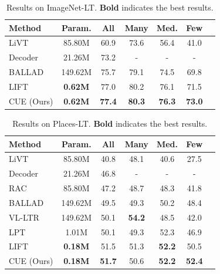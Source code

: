 \begin{table}[!t]
\centering
\caption{Results on ImageNet-LT.  \textbf{Bold} indicates the best results.}
\label{tab:imagenet}
\footnotesize
\begin{tabular}{l|c|ccccc}
\toprule
\textbf{Method}  & \textbf{Param.} & \textbf{All} & \textbf{Many} & \textbf{Med.} & \textbf{Few} \\
\midrule
LiVT~\cite{xu2023learning}    & 85.80M              & 60.9          & 73.6          & 56.4          & 41.0          \\
Decoder~\cite{wang2024exploring} & 21.26M         & 73.2          & -             & -             & -             \\
BALLAD~\cite{ma2021simple}  & 149.62M        & 75.7          & 79.1          & 74.5          & 69.8          \\
LIFT~\cite{shi2024long}    & \textbf{0.62M} & 77.0          & 80.2          & 76.1          & 71.5          \\
\midrule
CUE (Ours)    & \textbf{0.62M} & \textbf{77.4} & \textbf{80.3} & \textbf{76.3} & \textbf{73.0} \\
\bottomrule
\end{tabular}
\end{table}



\begin{table}[!t]
\centering
\caption{Results on Places-LT. \textbf{Bold} indicates the best results.}
\label{tab:places}
\footnotesize
\begin{tabular}{l|c|ccccc}
\toprule
\textbf{Method}  & \textbf{Param.} & \textbf{All} & \textbf{Many} & \textbf{Med.} & \textbf{Few} \\
\midrule
LiVT~\cite{xu2023learning}    & 85.80M               & 40.8          & 48.1          & 40.6          & 27.5          \\
Decoder~\cite{wang2024exploring} & 21.26M           & 46.8          & -             & -             & -             \\
RAC~\cite{long2022retrieval}     & 85.80M           & 47.2          & 48.7          & 48.3          & 41.8          \\
BALLAD~\cite{ma2021simple}       & 149.62M          & 49.5          & 49.3          & 50.2          & 48.4          \\
VL-LTR~\cite{tian2022vl}                          & 149.62M          & 50.1          & \textbf{54.2} & 48.5          & 42.0          \\
LPT~\cite{dong2023lpt}           & 1.01M            & 50.1          & 49.3          & 52.3          & 46.9          \\
LIFT~\cite{shi2024long}          & \textbf{0.18M}   & 51.5          & 51.3          & \textbf{52.2}          & 50.5          \\
\midrule
CUE (Ours)                       & \textbf{0.18M}   & \textbf{51.7} & 50.6          & \textbf{52.2} & \textbf{52.4} \\
\bottomrule
\end{tabular}
\end{table}




